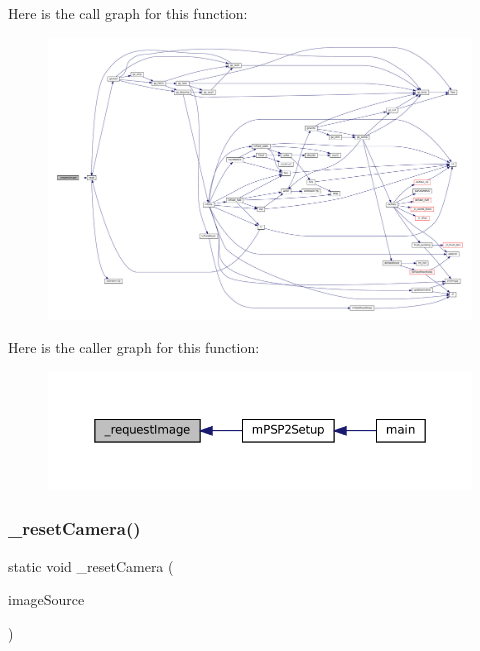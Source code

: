 Here is the call graph for this function\+:
\nopagebreak
\begin{figure}[H]
\begin{center}
\leavevmode
\includegraphics[width=350pt]{psp2-context_8c_afd6bb33399978f5ee1d82f3b905f8eec_cgraph}
\end{center}
\end{figure}
Here is the caller graph for this function\+:
\nopagebreak
\begin{figure}[H]
\begin{center}
\leavevmode
\includegraphics[width=350pt]{psp2-context_8c_afd6bb33399978f5ee1d82f3b905f8eec_icgraph}
\end{center}
\end{figure}
\mbox{\label{psp2-context_8c_a523acbf5391e625edb0e8d8465ff6e51}} 
\subsubsection{\texorpdfstring{\+\_\+reset\+Camera()}{\_resetCamera()}}
{\footnotesize\ttfamily static void \+\_\+reset\+Camera (\begin{DoxyParamCaption}\item[{struct m\+Sce\+Image\+Source $\ast$}]{image\+Source }\end{DoxyParamCaption})\hspace{0.3cm}{\ttfamily [static]}}

